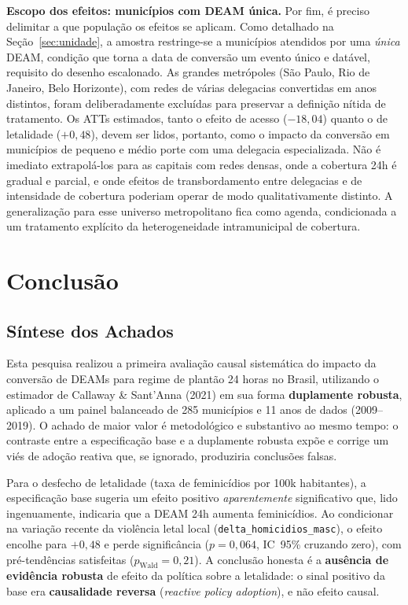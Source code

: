 \documentclass[twocolumn, 10pt]{article}
\begin{document}
\textbf{Escopo dos efeitos: municípios com DEAM única.} Por fim, é preciso
delimitar a que população os efeitos se aplicam. Como detalhado na
Seção~\ref{sec:unidade}, a amostra restringe-se a municípios atendidos por uma
\textit{única} DEAM, condição que torna a data de conversão um evento único e
datável, requisito do desenho escalonado. As grandes metrópoles (São Paulo, Rio
de Janeiro, Belo Horizonte), com redes de várias delegacias convertidas em anos
distintos, foram deliberadamente excluídas para preservar a definição nítida de
tratamento. Os ATTs estimados, tanto o efeito de acesso ($-18{,}04$) quanto o de
letalidade ($+0{,}48$), devem ser lidos, portanto, como o impacto da conversão
em municípios de pequeno e médio porte com uma delegacia especializada. Não é
imediato extrapolá-los para as capitais com redes densas, onde a cobertura 24h é
gradual e parcial, e onde efeitos de transbordamento entre delegacias e de
intensidade de cobertura poderiam operar de modo qualitativamente distinto. A
generalização para esse universo metropolitano fica como agenda, condicionada a
um tratamento explícito da heterogeneidade intramunicipal de cobertura.

\section{Conclusão}

\subsection{Síntese dos Achados}

Esta pesquisa realizou a primeira avaliação causal sistemática do impacto da
conversão de DEAMs para regime de plantão 24 horas no Brasil, utilizando o
estimador de Callaway \& Sant'Anna (2021) em sua forma \textbf{duplamente
robusta}, aplicado a um painel balanceado de 285 municípios e 11 anos de dados
(2009--2019). O achado de maior valor é metodológico e substantivo ao mesmo
tempo: o contraste entre a especificação base e a duplamente robusta expõe e
corrige um viés de adoção reativa que, se ignorado, produziria conclusões falsas.

Para o desfecho de letalidade (taxa de feminicídios por 100k habitantes), a
especificação base sugeria um efeito positivo \textit{aparentemente}
significativo que, lido ingenuamente, indicaria que a DEAM 24h aumenta
feminicídios. Ao condicionar na variação recente da violência letal local
(\texttt{delta\_homicidios\_masc}), o efeito encolhe para $+0{,}48$ e perde
significância ($p=0{,}064$, IC~95\% cruzando zero), com pré-tendências
satisfeitas ($p_{\text{Wald}}=0{,}21$). A conclusão honesta é a \textbf{ausência
de evidência robusta} de efeito da política sobre a letalidade: o sinal positivo
da base era \textbf{causalidade reversa} (\textit{reactive policy adoption}), e
não efeito causal.
\end{document}
